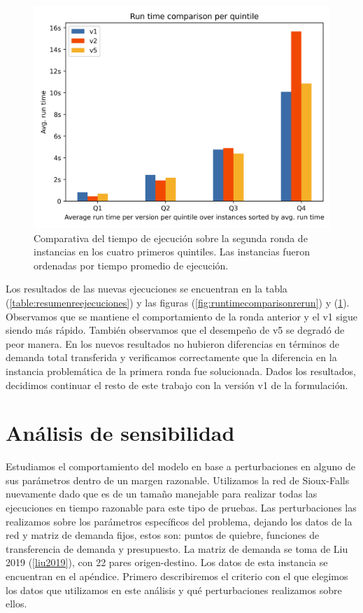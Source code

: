 \documentclass{article}
\begin{document}
  \begin{figure}[h!]
    \centering
    \includegraphics[width=12cm]{../resources/run_time_comparsion_by_quintile_rerun.png}
    \caption{Comparativa del tiempo de ejecución sobre la segunda ronda de instancias en los cuatro primeros quintiles. Las instancias fueron ordenadas por tiempo promedio de ejecución.} \label{fig:firstfourquintilesrerun}
  \end{figure}

  Los resultados de las nuevas ejecuciones se encuentran en la tabla (\ref{table:resumenreejecuciones}) y las figuras (\ref{fig:runtimecomparisonrerun}) y (\ref{fig:firstfourquintilesrerun}). Observamos que se mantiene el comportamiento de la ronda anterior y el v1 sigue siendo más rápido. También observamos que el desempeño de v5 se degradó de peor manera. En los nuevos resultados no hubieron diferencias en términos de demanda total transferida y verificamos correctamente que la diferencia en la instancia problemática de la primera ronda fue solucionada. Dados los resultados, decidimos continuar el resto de este trabajo con la versión v1 de la formulación.


  \section{Análisis de sensibilidad}

  Estudiamos el comportamiento del modelo en base a perturbaciones en alguno de sus parámetros dentro de un margen razonable. Utilizamos la red de Sioux-Falls nuevamente dado que es de un tamaño manejable para realizar todas las ejecuciones en tiempo razonable para este tipo de pruebas. Las perturbaciones las realizamos sobre los parámetros específicos del problema, dejando los datos de la red y matriz de demanda fijos, estos son: puntos de quiebre, funciones de transferencia de demanda y presupuesto. La matriz de demanda se toma de Liu 2019 (\ref{liu2019}), con 22 pares origen-destino. Los datos de esta instancia se encuentran en el apéndice. Primero describiremos el criterio con el que elegimos los datos que utilizamos en este análisis y qué perturbaciones realizamos sobre ellos.
\end{document}
